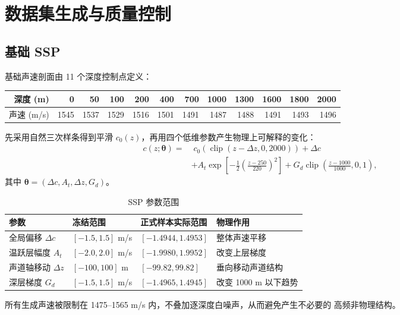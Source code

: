 \documentclass[UTF8,12pt,openany]{ctexrep}
\begin{document}
\chapter{数据集生成与质量控制}
\label{chap:data}

\section{基础 SSP}

基础声速剖面由 11 个深度控制点定义：
\begin{center}
\small
\begin{tabular}{r|rrrrrrrrrrr}
深度 (m) & 0 & 50 & 100 & 200 & 400 & 700 & 1000 & 1300 & 1600 & 1800 & 2000 \\
\hline
声速 (m/s) & 1545 & 1537 & 1529 & 1516 & 1501 & 1491 & 1487 & 1488 & 1491 & 1493 & 1496 \\
\end{tabular}
\end{center}

先采用自然三次样条得到平滑 $c_0(z)$，再用四个低维参数产生物理上可解释的变化：
\begin{align}
c(z;\bm{\theta})=
&\;c_0\!\left(\operatorname{clip}(z-\Delta z,0,2000)\right)+\Delta c \\
&+ A_t\exp\left[-\frac{1}{2}\left(\frac{z-250}{220}\right)^2\right]
+G_d\operatorname{clip}\left(\frac{z-1000}{1000},0,1\right),
\end{align}
其中 $\bm{\theta}=(\Delta c,A_t,\Delta z,G_d)$。

\begin{table}[H]
\centering
\caption{SSP 参数范围}
\begin{tabularx}{\textwidth}{L{4.0cm}L{3.2cm}L{3.4cm}Y}
\toprule
参数 & 冻结范围 & 正式样本实际范围 & 物理作用 \\
\midrule
全局偏移 $\Delta c$ & $[-1.5,1.5]$ m/s & $[-1.4944,1.4953]$ & 整体声速平移 \\
温跃层幅度 $A_t$ & $[-2.0,2.0]$ m/s & $[-1.9980,1.9952]$ & 改变上层梯度 \\
声道轴移动 $\Delta z$ & $[-100,100]$ m & $[-99.82,99.82]$ & 垂向移动声道结构 \\
深层梯度 $G_d$ & $[-1.5,1.5]$ m/s & $[-1.4965,1.4945]$ & 改变 1000 m 以下趋势 \\
\bottomrule
\end{tabularx}
\end{table}

所有生成声速被限制在 1475--1565 m/s 内，不叠加逐深度白噪声，从而避免产生不必要的
高频非物理结构。
\end{document}
